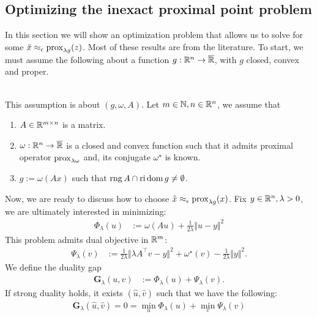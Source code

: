\documentclass[12pt]{article}
\DeclareMathOperator{\rng}{\mathop{rng}}
\begin{document}
    \subsection{Optimizing the inexact proximal point problem}
        In this section we will show an optimization problem that allows us to solve for some $\tilde x \approx_\epsilon \operatorname{prox}_{\lambda g}(z)$. 
        Most of these results are from the literature. 
        To start, we must assume the following about a function $g: \mathbb R^n \rightarrow \overline {\mathbb R}$, with $g$ closed, convex and proper. 
        \begin{assumption}\;\label{ass:for-inxt-prox}\\
            This assumption is about $(g, \omega, A)$. 
            Let $m \in \mathbb N, n \in \mathbb R^n$, we assume that 
            \begin{enumerate}[nosep]
                \item $A\in \mathbb R^{m \times n}$ is a matrix. 
                \item $\omega: \mathbb R^n \rightarrow \overline {\mathbb R}$ is a closed and convex function such that it admits proximal operator $\operatorname{prox}_{\lambda\omega}$ and, its conjugate $\omega^\star$ is known. 
                \item $g := \omega(Ax)$ such that $\rng A \cap \reli\dom g \neq\emptyset$. 
            \end{enumerate}
        \end{assumption}
        Now, we are ready to discuss how to choose $\tilde x \approx_\epsilon \operatorname{prox}_{\lambda g}(x)$. 
        Fix $y \in \mathbb R^n, \lambda > 0$, we are ultimately interested in minimizing: 
        \begin{align}
            \Phi_\lambda(u) &:= \omega(Au) + \frac{1}{2\lambda} \Vert u - y\Vert^2
        \end{align}
        This problem admits dual objective in $\mathbb R^m$: 
        \begin{align}
            \Psi_\lambda(v) &:=
            \frac{1}{2\lambda}\Vert \lambda A^\top v - y\Vert^2
            + \omega^\star(v) - \frac{1}{2\lambda}\Vert y\Vert^2. 
        \end{align}
        We define the duality gap
        \begin{align}
            \mathbf G_\lambda(u, v) &:= \Phi_\lambda(u) + \Psi_\lambda(v). 
        \end{align}
        If strong duality holds, it exists $(\hat u, \hat v)$ such that we have the following: 
        \begin{align*}
            \mathbf G_\lambda(\hat u, \hat v) = 0 = \min_{u} \Phi_\lambda(u) + \min_v \Psi_\lambda(v)
        \end{align*}
\end{document}
